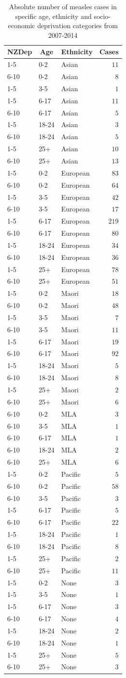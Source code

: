 \documentclass{article}
\begin{document}
\begin{table}\tiny
\caption{Absolute number of measles cases in specific age, ethnicity and socio-economic deprivation categories from 2007-2014}
\begin{center}
\begin{tabular}{lllr}
\hline\hline
\multicolumn{1}{c}{NZDep}&\multicolumn{1}{c}{Age}&\multicolumn{1}{c}{Ethnicity}&\multicolumn{1}{c}{Cases}\tabularnewline
\hline
1-5&0-2&Asian&$ 11$\tabularnewline
6-10&0-2&Asian&$  8$\tabularnewline
1-5&3-5&Asian&$  1$\tabularnewline
1-5&6-17&Asian&$ 11$\tabularnewline
6-10&6-17&Asian&$  5$\tabularnewline
1-5&18-24&Asian&$  3$\tabularnewline
6-10&18-24&Asian&$  5$\tabularnewline
1-5&25+&Asian&$ 10$\tabularnewline
6-10&25+&Asian&$ 13$\tabularnewline
1-5&0-2&European&$ 83$\tabularnewline
6-10&0-2&European&$ 64$\tabularnewline
1-5&3-5&European&$ 42$\tabularnewline
6-10&3-5&European&$ 17$\tabularnewline
1-5&6-17&European&$219$\tabularnewline
6-10&6-17&European&$ 80$\tabularnewline
1-5&18-24&European&$ 34$\tabularnewline
6-10&18-24&European&$ 36$\tabularnewline
1-5&25+&European&$ 78$\tabularnewline
6-10&25+&European&$ 51$\tabularnewline
1-5&0-2&Maori&$ 18$\tabularnewline
6-10&0-2&Maori&$ 48$\tabularnewline
1-5&3-5&Maori&$  7$\tabularnewline
6-10&3-5&Maori&$ 11$\tabularnewline
1-5&6-17&Maori&$ 19$\tabularnewline
6-10&6-17&Maori&$ 92$\tabularnewline
1-5&18-24&Maori&$  5$\tabularnewline
6-10&18-24&Maori&$  8$\tabularnewline
1-5&25+&Maori&$  2$\tabularnewline
6-10&25+&Maori&$  6$\tabularnewline
6-10&0-2&MLA&$  3$\tabularnewline
6-10&3-5&MLA&$  1$\tabularnewline
6-10&6-17&MLA&$  1$\tabularnewline
6-10&18-24&MLA&$  2$\tabularnewline
6-10&25+&MLA&$  6$\tabularnewline
1-5&0-2&Pacific&$  5$\tabularnewline
6-10&0-2&Pacific&$ 58$\tabularnewline
6-10&3-5&Pacific&$  3$\tabularnewline
1-5&6-17&Pacific&$  5$\tabularnewline
6-10&6-17&Pacific&$ 22$\tabularnewline
1-5&18-24&Pacific&$  1$\tabularnewline
6-10&18-24&Pacific&$  8$\tabularnewline
1-5&25+&Pacific&$  2$\tabularnewline
6-10&25+&Pacific&$ 11$\tabularnewline
1-5&0-2&None&$  3$\tabularnewline
1-5&3-5&None&$  1$\tabularnewline
1-5&6-17&None&$  3$\tabularnewline
6-10&6-17&None&$  4$\tabularnewline
1-5&18-24&None&$  2$\tabularnewline
6-10&18-24&None&$  1$\tabularnewline
1-5&25+&None&$  5$\tabularnewline
6-10&25+&None&$  3$\tabularnewline
\hline
\end{tabular}\end{center}\label{table:case}
\end{table}
\end{document}
